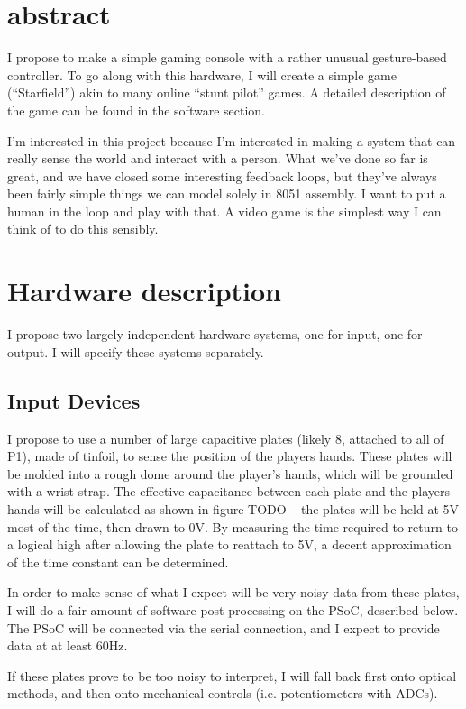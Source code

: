 \section{abstract}

I propose to make a simple gaming console with a rather unusual gesture-based controller. To go along with this hardware, I will create a simple game (``Starfield'') akin to many online ``stunt pilot'' games. A detailed description of the game can be found in the software section.

I'm interested in this project because I'm interested in making a system that can really sense the world and interact with a person. What we've done so far is great, and we have closed some interesting feedback loops, but they've always been fairly simple things we can model solely in 8051 assembly. I want to put a human in the loop and play with that. A video game is the simplest way I can think of to do this sensibly.

\section{Hardware description}

I propose two largely independent hardware systems, one for input, one for output. I will specify these systems separately.

\subsection{Input Devices}

I propose to use a number of large capacitive plates (likely 8, attached to all of P1), made of tinfoil, to sense the position of the players hands. These plates will be molded into a rough dome around the player's hands, which will be grounded with a wrist strap. The effective capacitance between each plate and the players hands will be calculated as shown in figure TODO -- the plates will be held at 5V most of the time, then drawn to 0V. By measuring the time required to return to a logical high after allowing the plate to reattach to 5V, a decent approximation of the time constant can be determined.

In order to make sense of what I expect will be very noisy data from these plates, I will do a fair amount of software post-processing on the PSoC, described below. The PSoC will be connected via the serial connection, and I expect to provide data at at least 60Hz.

If these plates prove to be too noisy to interpret, I will fall back first onto optical methods, and then onto mechanical controls (i.e. potentiometers with ADCs).

